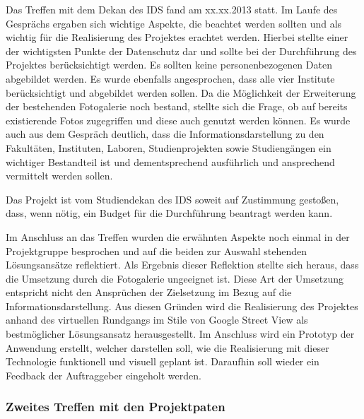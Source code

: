 Das Treffen mit dem Dekan des IDS fand am xx.xx.2013 statt.%
Im Laufe des Gesprächs ergaben sich wichtige Aspekte, die beachtet werden sollten und als wichtig für die Realisierung 
des Projektes erachtet werden. Hierbei stellte einer der wichtigsten Punkte der Datenschutz dar und sollte bei der 
Durchführung des Projektes berücksichtigt werden. Es sollten keine personenbezogenen Daten abgebildet werden.
Es wurde ebenfalls angesprochen, dass alle vier Institute berücksichtigt und abgebildet werden sollen. Da die Möglichkeit 
der Erweiterung der bestehenden Fotogalerie noch bestand, stellte sich die Frage, ob auf bereits existierende Fotos 
zugegriffen und diese auch genutzt werden können. 
Es wurde auch aus dem Gespräch deutlich, dass die Informationsdarstellung zu den Fakultäten, Instituten, Laboren, 
Studienprojekten sowie Studiengängen ein wichtiger Bestandteil ist und dementsprechend ausführlich und ansprechend 
vermittelt werden sollen.

Das Projekt ist vom Studiendekan des IDS soweit auf Zustimmung gestoßen, dass, wenn nötig, ein Budget für die 
Durchführung beantragt werden kann.

Im Anschluss an das Treffen wurden die erwähnten Aspekte noch einmal in der Projektgruppe besprochen und auf die beiden 
zur Auswahl stehenden Lösungsansätze reflektiert. Als Ergebnis dieser Reflektion stellte sich heraus, dass die Umsetzung 
durch die Fotogalerie ungeeignet ist. Diese Art der Umsetzung entspricht nicht den Ansprüchen der Zielsetzung im Bezug 
auf die Informationsdarstellung.
Aus diesen Gründen wird die Realisierung des Projektes anhand des virtuellen Rundgangs im Stile von Google Street View 
als bestmöglicher Lösungsansatz herausgestellt. Im Anschluss wird ein Prototyp der Anwendung erstellt, welcher darstellen 
soll, wie die Realisierung mit dieser Technologie funktionell und visuell geplant ist. Daraufhin soll wieder ein Feedback 
der Auftraggeber eingeholt werden.

\subsubsection*{Zweites Treffen mit den Projektpaten}
\label{sec:Treffen3}

